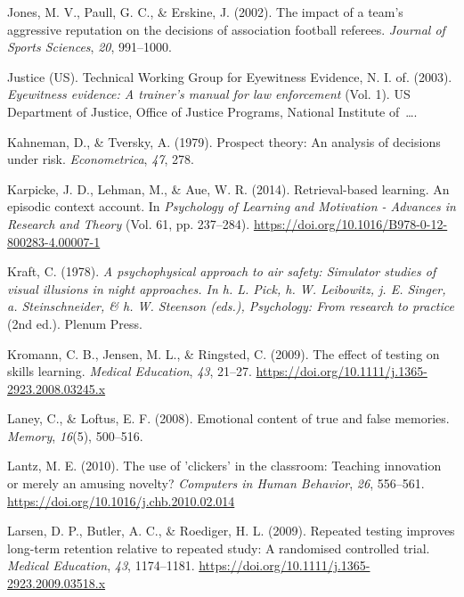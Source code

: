 \documentclass[
]{krantz}
\newlength{\cslhangindent}
\newlength{\cslentryspacingunit} %
\newenvironment{CSLReferences}[2] %
 {%
  \setlength{\parindent}{0pt}
  \ifodd #1
  \let\oldpar\par
  \def\par{\hangindent=\cslhangindent\oldpar}
  \fi
  \setlength{\parskip}{#2\cslentryspacingunit}
 }%
 {}
\begin{document}
\begin{CSLReferences}{1}{0}
\leavevmode{}%
Jones, M. V., Paull, G. C., \& Erskine, J. (2002). The impact of a team's aggressive reputation on the decisions of association football referees. \emph{Journal of Sports Sciences}, \emph{20}, 991--1000.

\leavevmode{}%
Justice (US). Technical Working Group for Eyewitness Evidence, N. I. of. (2003). \emph{Eyewitness evidence: A trainer's manual for law enforcement} (Vol. 1). US Department of Justice, Office of Justice Programs, National Institute of~\ldots.

\leavevmode{}%
Kahneman, D., \& Tversky, A. (1979). Prospect theory: An analysis of decisions under risk. \emph{Econometrica}, \emph{47}, 278.

\leavevmode{}%
Karpicke, J. D., Lehman, M., \& Aue, W. R. (2014). Retrieval-based learning. An episodic context account. In \emph{Psychology of Learning and Motivation - Advances in Research and Theory} (Vol. 61, pp. 237--284). \url{https://doi.org/10.1016/B978-0-12-800283-4.00007-1}

\leavevmode{}%
Kraft, C. (1978). \emph{A psychophysical approach to air safety: Simulator studies of visual illusions in night approaches. In h. L. Pick, h. W. Leibowitz, j. E. Singer, a. Steinschneider, \& h. W. Steenson (eds.), Psychology: From research to practice} (2nd ed.). Plenum Press.

\leavevmode{}%
Kromann, C. B., Jensen, M. L., \& Ringsted, C. (2009). The effect of testing on skills learning. \emph{Medical Education}, \emph{43}, 21--27. \url{https://doi.org/10.1111/j.1365-2923.2008.03245.x}

\leavevmode{}%
Laney, C., \& Loftus, E. F. (2008). Emotional content of true and false memories. \emph{Memory}, \emph{16}(5), 500--516.

\leavevmode{}%
Lantz, M. E. (2010). The use of 'clickers' in the classroom: Teaching innovation or merely an amusing novelty? \emph{Computers in Human Behavior}, \emph{26}, 556--561. \url{https://doi.org/10.1016/j.chb.2010.02.014}

\leavevmode{}%
Larsen, D. P., Butler, A. C., \& Roediger, H. L. (2009). Repeated testing improves long-term retention relative to repeated study: A randomised controlled trial. \emph{Medical Education}, \emph{43}, 1174--1181. \url{https://doi.org/10.1111/j.1365-2923.2009.03518.x}


\end{CSLReferences}
\end{document}
